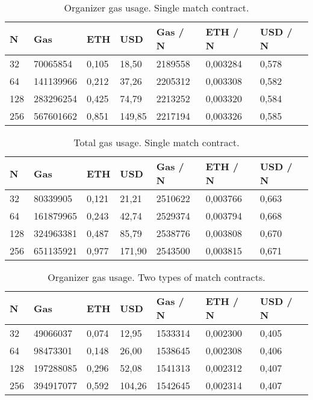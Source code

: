 \begin{table}[h]
\centering
\caption{Organizer gas usage. Single match contract.}
\begin{tabular}{|l|l|l|l|l|l|l|}
\hline

N & Gas & ETH & USD & Gas / N & ETH / N & USD / N \\ \hline
32 & 70065854 & 0,105 & 18,50 & 2189558 & 0,003284 & 0,578 \\ \hline
64 & 141139966 & 0,212 & 37,26 & 2205312 & 0,003308 & 0,582 \\ \hline
128 & 283296254 & 0,425 & 74,79 & 2213252 & 0,003320 & 0,584 \\ \hline
256 & 567601662 & 0,851 & 149,85 & 2217194 & 0,003326 & 0,585 \\ \hline

\end{tabular}
\end{table}

\begin{table}[h]
\centering
\caption{Total gas usage. Single match contract.}
\begin{tabular}{|l|l|l|l|l|l|l|}
\hline

N & Gas & ETH & USD & Gas / N & ETH / N & USD / N \\ \hline
32 & 80339905 & 0,121 & 21,21 & 2510622 & 0,003766 & 0,663 \\ \hline
64 & 161879965 & 0,243 & 42,74 & 2529374 & 0,003794 & 0,668 \\ \hline
128 & 324963381 & 0,487 & 85,79 & 2538776 & 0,003808 & 0,670 \\ \hline
256 & 651135921 & 0,977 & 171,90 & 2543500 & 0,003815 & 0,671 \\ \hline

\end{tabular}
\end{table}

\begin{table}[h]
\centering
\caption{Organizer gas usage. Two types of match contracts.}
\begin{tabular}{|l|l|l|l|l|l|l|}
\hline

N & Gas & ETH & USD & Gas / N & ETH / N & USD / N \\ \hline
32 & 49066037 & 0,074 & 12,95 & 1533314 & 0,002300 & 0,405 \\ \hline
64 & 98473301 & 0,148 & 26,00 & 1538645 & 0,002308 & 0,406 \\ \hline
128 & 197288085 & 0,296 & 52,08 & 1541313 & 0,002312 & 0,407 \\ \hline
256 & 394917077 & 0,592 & 104,26 & 1542645 & 0,002314 & 0,407 \\ \hline

\end{tabular}
\end{table}

